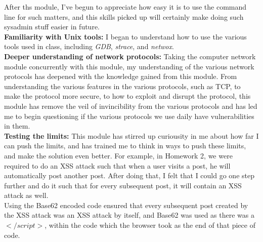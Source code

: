 \documentclass[12pt]{article}
\begin{document}
After ths module, I've begun to appreciate how easy it is to use the command line for such matters, and this skills picked up will certainly make doing such sysadmin stuff easier in future. \\

\textbf{Familiarity with Unix tools:} I began to understand how to use the various tools used in class, including \emph{GDB}, \emph{strace}, and \emph{netwox}. \\

\textbf{Deeper understanding of network protocols:} Taking the computer network module concurrently with this module, my understanding of the various network protocols has deepened with the knowledge gained from this module. From understanding the various features in the various protocols, such as TCP, to make the protocol more secure, to how to exploit and disrupt the protocol, this module has remove the veil of invincibility from the various protocols and has led me to begin questioning if the various protocols we use daily have vulnerabilities in them. \\ 

\textbf{Testing the limits:} This module has stirred up curiousity in me about how far I can push the limits, and has trained me to think in ways to push these limits, and make the solution even better. For example, in Homework 2, we were required to do an XSS attack such that when a user visits a post, he will automatically post another post. After doing that, I felt that I could go one step further and do it such that for every subsequent post, it will contain an XSS attack as well. \\





Using the Base62 encoded code ensured that every subsequent post created by the XSS attack was an XSS attack by itself, and Base62 was used as there was a $</script>$, within the code which the browser took as the end of that piece of code. \\

\enddocument
\end{document}
